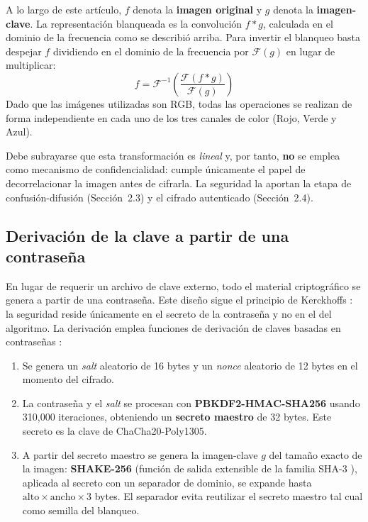\documentclass{llncs}
\begin{document}
A lo largo de este art\'iculo, $f$ denota la \textbf{imagen original} y $g$
denota la \textbf{imagen-clave}. La representaci\'on blanqueada es la
convoluci\'on $f * g$, calculada en el dominio de la frecuencia como se
describi\'o arriba. Para invertir el blanqueo basta despejar $f$ dividiendo
en el dominio de la frecuencia por $\mathcal{F}(g)$ en lugar de multiplicar:
\[
f = \mathcal{F}^{-1}\left(\frac{\mathcal{F}(f * g)}{\mathcal{F}(g)}\right)
\]
Dado que las im\'agenes utilizadas son RGB, todas las operaciones se
realizan de forma independiente en cada uno de los tres canales de color
(Rojo, Verde y Azul).

Debe subrayarse que esta transformaci\'on es \emph{lineal} y, por tanto,
\textbf{no} se emplea como mecanismo de confidencialidad: cumple \'unicamente
el papel de decorrelacionar la imagen antes de cifrarla. La seguridad la
aportan la etapa de confusi\'on-difusi\'on (Secci\'on~2.3) y el cifrado
autenticado (Secci\'on~2.4).

\subsection{Derivaci\'on de la clave a partir de una contrase\~na}

En lugar de requerir un archivo de clave externo, todo el material
criptogr\'afico se genera a partir de una contrase\~na. Este dise\~no sigue
el principio de Kerckhoffs \cite{kerckhoffs}: la seguridad reside
\'unicamente en el secreto de la contrase\~na y no en el del algoritmo. La
derivaci\'on emplea funciones de derivaci\'on de claves basadas en
contrase\~nas \cite{nist800132,scrypt}:

\begin{enumerate}
  \item Se genera un \emph{salt} aleatorio de 16 bytes y un \emph{nonce}
    aleatorio de 12 bytes en el momento del cifrado.
  \item La contrase\~na y el \emph{salt} se procesan con
    \textbf{PBKDF2-HMAC-SHA256} \cite{pbkdf2} usando 310{,}000 iteraciones,
    obteniendo un \textbf{secreto maestro} de 32 bytes. Este secreto es la
    clave de ChaCha20-Poly1305.
  \item A partir del secreto maestro se genera la imagen-clave $g$ del
    tama\~no exacto de la imagen: \textbf{SHAKE-256} (funci\'on de salida
    extensible de la familia SHA-3 \cite{sha3}), aplicada al secreto con un
    separador de dominio, se expande hasta
    $\text{alto}\times\text{ancho}\times 3$ bytes. El separador evita
    reutilizar el secreto maestro tal cual como semilla del blanqueo.
\end{enumerate}
\end{document}

